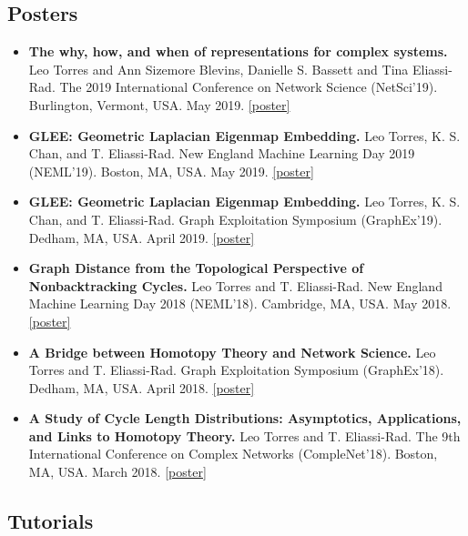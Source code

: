 \documentclass[12pt,]{scrartcl}
\begin{document}
\subsection{Posters}\label{posters}

\begin{itemize}
\leftskip-0.25in %

\item \textbf{The why, how, and when of representations for complex systems.} Leo Torres and Ann Sizemore Blevins, Danielle S. Bassett and Tina Eliassi-Rad. The 2019 International Conference on Network Science (NetSci'19). Burlington, Vermont, USA. May 2019. \href{http://leotrs.com/static/hyper_poster.pdf}{[poster]}

\item \textbf{GLEE: Geometric Laplacian Eigenmap Embedding.} Leo Torres, K. S. Chan, and T. Eliassi-Rad. New England Machine Learning Day 2019 (NEML'19). Boston, MA, USA. May 2019. \href{http://leotrs.com/static/glee_poster.pdf}{[poster]}

\item \textbf{GLEE: Geometric Laplacian Eigenmap Embedding.} Leo Torres, K. S. Chan, and T. Eliassi-Rad. Graph Exploitation Symposium (GraphEx'19). Dedham, MA, USA. April 2019. \href{http://leotrs.com/static/glee_poster.pdf}{[poster]}

\item \textbf{Graph Distance from the Topological Perspective of Nonbacktracking Cycles.} Leo Torres and T. Eliassi-Rad. New England Machine Learning Day 2018 (NEML'18). Cambridge, MA, USA. May 2018. \href{http://leotrs.com/static/neml18.pdf}{[poster]}

\item \textbf{A Bridge between Homotopy Theory and Network Science.} Leo Torres and T. Eliassi-Rad. Graph Exploitation Symposium (GraphEx'18). Dedham, MA, USA. April 2018. \href{http://leotrs.com/static/graphex18.pdf}{[poster]}

\item \textbf{A Study of Cycle Length Distributions: Asymptotics, Applications, and Links to Homotopy Theory.} Leo Torres and T. Eliassi-Rad. The 9th International Conference on Complex Networks (CompleNet'18). Boston, MA, USA. March 2018. \href{http://leotrs.com/static/complenet18.pdf}{[poster]}

\end{itemize}


\subsection{Tutorials}\label{tutorials}
\end{document}

